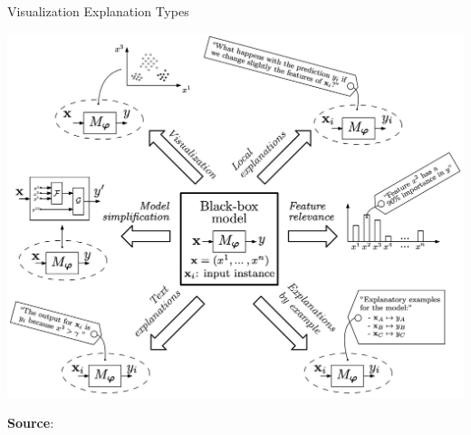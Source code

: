 \documentclass[11pt,dvipsnames,usenames,aspectratio=169]{beamer}  %
\begin{document}
\begin{frame}{Visualization Explanation Types}
  \begin{center}
    \includegraphics[scale=0.177]{visual_representation_explanation_types.png}
  \end{center}
  \begin{flushright}
    {\vspace{-16pt} \tiny \textbf{Source}:~\citep{Arrieta:2020}}
  \end{flushright}
\end{frame}
\end{document}
